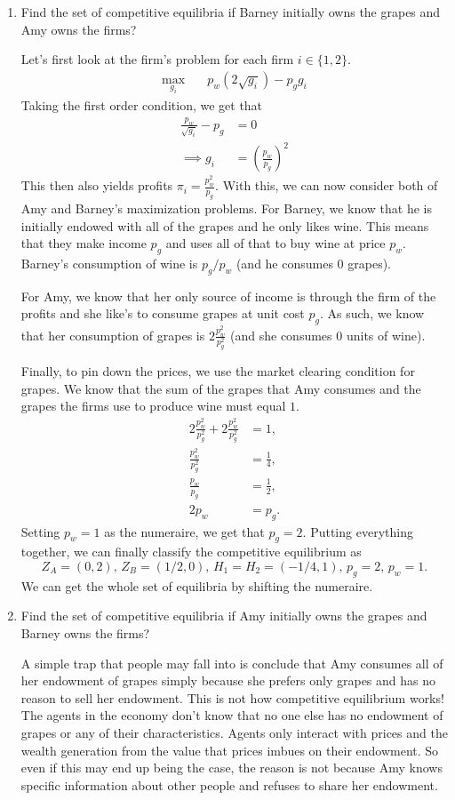 \documentclass[11pt,english]{article}
\begin{document}
\begin{enumerate}[label = (\alph*)]
\begin{solution}
\end{solution}
    \item Find the set of competitive equilibria if Barney initially owns the grapes and Amy owns the firms?
\begin{solution} 
Let's first look at the firm's problem for each firm $i\in \{1,2\}$.
\begin{align*}
\max_{g_i}&\quad p_w(2\sqrt{g_i}) - p_g g_i
\end{align*} Taking the first order condition, we get that 
\begin{align*}
\frac{p_w}{\sqrt{g_i}} - p_g &= 0\\
\implies g_i &= \left(\frac{p_w}{p_g}\right)^2
\end{align*} This then also yields profits $\pi_i = \frac{p_w^2}{p_g}.$ With this, we can now consider both of Amy and Barney's maximization problems. For Barney, we know that he is initially endowed with all of the grapes and he only likes wine. This means that they make income $p_g$ and uses all of that to buy wine at price $p_w$. Barney's consumption of wine is $p_g/p_w$ (and he consumes 0 grapes).

For Amy, we know that her only source of income is through the firm of the profits and she like's to consume grapes at unit cost $p_g$. As such, we know that her consumption of grapes is $2\frac{p_w^2}{p_g^2}$ (and she consumes 0 units of wine).

Finally, to pin down the prices, we use the market clearing condition for grapes. We know that the sum of the grapes that Amy consumes and the grapes the firms use to produce wine must equal $1$.
\begin{align*}
2\frac{p_w^2}{p_g^2} + 2\frac{p_w^2}{p_g^2} &= 1,\\
\frac{p_w^2}{p_g^2} &= \frac{1}{4},\\
\frac{p_w}{p_g} &= \frac{1}{2},\\
2p_w &= p_g.
\end{align*} Setting $p_w = 1$  as the numeraire, we get that $p_g = 2$. Putting everything together, we can finally classify the competitive equilibrium as 
$$\boxed{Z_A = (0,2),\,Z_B = (1/2, 0),\, H_1 = H_2 = (-1/4, 1),\, p_g = 2,\, p_w = 1.}$$
We can get the whole set of equilibria by shifting the numeraire.
\end{solution}
    \item Find the set of competitive equilibria if Amy initially owns the grapes and Barney owns the firms?
\begin{solution}
A simple trap that people may fall into is conclude that Amy consumes all of her endowment of grapes simply because she prefers only grapes and has no reason to sell her endowment. This is not how competitive equilibrium works! The agents in the economy don't know that no one else has no endowment of grapes or any of their characteristics. Agents only interact with prices and the wealth generation from the value that prices imbues on their endowment. So even if this may end up being the case, the reason is not because Amy knows specific information about other people and refuses to share her endowment. 


\end{solution}
\end{enumerate}
\end{document}
